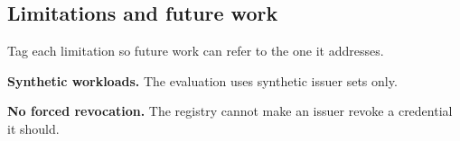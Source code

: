 \subsection[Limitations and future work]{Limitations and future work\skimmark}\label{guide:chapters:future}
Tag each limitation so future work can refer to the one it addresses.
\begin{limitations}
  \item\label{guide:lim:synthetic} \textbf{Synthetic workloads.} The evaluation uses synthetic issuer sets only.
  \item\label{guide:lim:force} \textbf{No forced revocation.} The registry cannot make an issuer revoke a credential it should.
\end{limitations}
